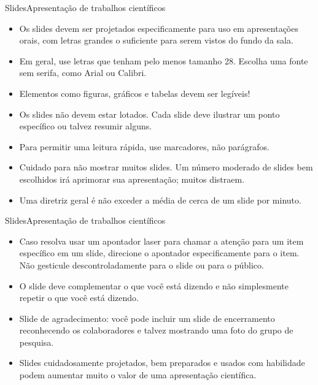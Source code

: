 \documentclass[t]{beamer}
\begin{document}

\begin{ftst}{Slides}{Apresentação de trabalhos científicos}
\begin{itemize}
    \item Os slides devem ser projetados especificamente para uso em apresentações orais, com letras grandes o suficiente para serem vistos do fundo da sala.
    \item Em geral, use letras que tenham pelo menos tamanho 28. Escolha uma fonte sem serifa, como Arial ou Calibri.
    \item Elementos como figuras, gráficos e tabelas devem ser legíveis!
    \item Os slides não devem estar lotados. Cada slide deve ilustrar um ponto específico ou talvez resumir alguns.
    \item Para permitir uma leitura rápida, use marcadores, não parágrafos.
    \item Cuidado para não mostrar muitos slides. Um número moderado de slides bem escolhidos irá aprimorar sua apresentação; muitos distraem. 
    \item Uma diretriz geral é não exceder a média de cerca de um slide por minuto.
\end{itemize}
\end{ftst}


\begin{ftst}{Slides}{Apresentação de trabalhos científicos}
\begin{itemize}
    \item Caso resolva usar um apontador laser para chamar a atenção para um item específico em um slide, direcione o apontador especificamente para o item. Não gesticule descontroladamente para o slide ou para o público.
    \item O slide deve complementar o que você está dizendo e não simplesmente repetir o que você está dizendo.
    \item Slide de agradecimento: você pode incluir um slide de encerramento reconhecendo os colaboradores e talvez mostrando uma foto do grupo de pesquisa. 
    \item Slides cuidadosamente projetados, bem preparados e usados com habilidade podem aumentar muito o valor de uma apresentação científica.
\end{itemize}
\end{ftst}

\end{document}
